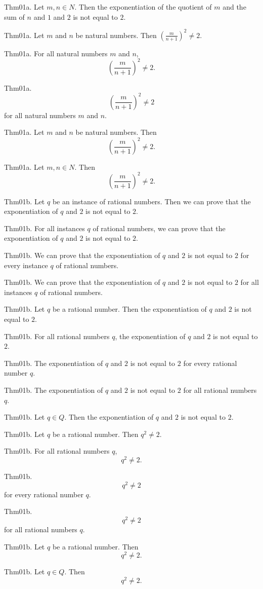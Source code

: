 \documentclass{article}
\begin{document}
Thm01a. Let $m , n \in N$. Then the exponentiation of the quotient of $m$ and the sum of $n$ and $1$ and $2$ is not equal to $2$.

Thm01a. Let $m$ and $n$ be natural numbers. Then $(\frac{ m}{n + 1})^ {2}\neq 2$.

Thm01a. For all natural numbers $m$ and $n$, $$(\frac{ m}{n + 1})^ {2}\neq 2.$$

Thm01a. $$(\frac{ m}{n + 1})^ {2}\neq 2$$ for all natural numbers $m$ and $n$.

Thm01a. Let $m$ and $n$ be natural numbers. Then $$(\frac{ m}{n + 1})^ {2}\neq 2.$$

Thm01a. Let $m , n \in N$. Then $$(\frac{ m}{n + 1})^ {2}\neq 2.$$

Thm01b. Let $q$ be an instance of rational numbers. Then we can prove that the exponentiation of $q$ and $2$ is not equal to $2$.

Thm01b. For all instances $q$ of rational numbers, we can prove that the exponentiation of $q$ and $2$ is not equal to $2$.

Thm01b. We can prove that the exponentiation of $q$ and $2$ is not equal to $2$ for every instance $q$ of rational numbers.

Thm01b. We can prove that the exponentiation of $q$ and $2$ is not equal to $2$ for all instances $q$ of rational numbers.

Thm01b. Let $q$ be a rational number. Then the exponentiation of $q$ and $2$ is not equal to $2$.

Thm01b. For all rational numbers $q$, the exponentiation of $q$ and $2$ is not equal to $2$.

Thm01b. The exponentiation of $q$ and $2$ is not equal to $2$ for every rational number $q$.

Thm01b. The exponentiation of $q$ and $2$ is not equal to $2$ for all rational numbers $q$.

Thm01b. Let $q \in Q$. Then the exponentiation of $q$ and $2$ is not equal to $2$.

Thm01b. Let $q$ be a rational number. Then $q ^ {2}\neq 2$.

Thm01b. For all rational numbers $q$, $$q ^ {2}\neq 2.$$

Thm01b. $$q ^ {2}\neq 2$$ for every rational number $q$.

Thm01b. $$q ^ {2}\neq 2$$ for all rational numbers $q$.

Thm01b. Let $q$ be a rational number. Then $$q ^ {2}\neq 2.$$

Thm01b. Let $q \in Q$. Then $$q ^ {2}\neq 2.$$
\end{document}
